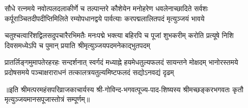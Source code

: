 \fourlineindentedshloka
{सौधे रत्नमये नवोत्पलदलाकीर्णे च तल्पान्तरे}
{कौशेयेन मनोहरेण धवलेनाच्छादिते सर्वशः}
{कर्पूराञ्चितदीपदीप्तिमिलिते रम्योपधानद्वये}
{पार्वत्याः करपद्मलालितपदं मृत्युञ्जयं भावये}%

\fourlineindentedshloka
{चतुश्चत्वारिंशद्विलसदुपचारैरभिमतैः}
{मनःपद्मे भक्त्या बहिरपि च पूजां शुभकरीम्}
{करोति प्रत्यूषे निशि दिवसमध्येऽपि च पुमान्}
{प्रयाति श्रीमृत्युञ्जयपदमनेकाद्भुतपदम्}%

\fourlineindentedshloka
{प्रातर्लिङ्गमुमापतेरहरहः सन्दर्शनात् स्वर्गदं}
{मध्याह्ने हयमेधतुल्यफलदं सायन्तने मोक्षदम्}
{भानोरस्तमये प्रदोषसमये पञ्चाक्षराराधनं}
{तत्कालत्रयतुल्यमिष्टफलदं सद्योऽनवद्यं दृढम्}%

॥इति श्रीमत्परमहंसपरिव्राजकाचार्यस्य श्री-गोविन्द-भगवत्पूज्य-पाद-शिष्यस्य
श्रीमच्छङ्करभगवतः कृतौ मृत्युञ्जयमानसपूजास्तोत्रं सम्पूर्णम्॥
